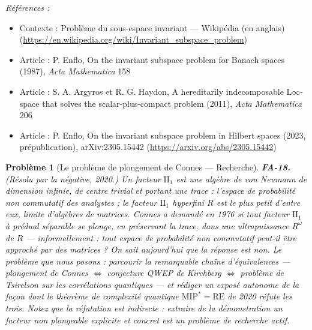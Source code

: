 \documentclass[11pt]{article}
\newtheorem{problem}{Problème}
\newenvironment{refs}{\par\small\noindent\emph{Références :}\begin{itemize}\setlength\itemsep{0pt}}{\end{itemize}\normalsize}
\begin{document}
\begin{refs}
\item Contexte : Problème du sous-espace invariant --- Wikipédia (en anglais) (\url{https://en.wikipedia.org/wiki/Invariant_subspace_problem})
\item Article : P. Enflo, \og{} On the invariant subspace problem for Banach spaces \fg{} (1987), \textit{Acta Mathematica} 158
\item Article : S. A. Argyros et R. G. Haydon, \og{} A hereditarily indecomposable L$\infty$-space that solves the scalar-plus-compact problem \fg{} (2011), \textit{Acta Mathematica} 206
\item Article : P. Enflo, \og{} On the invariant subspace problem in Hilbert spaces \fg{} (2023, prépublication), arXiv:2305.15442 (\url{https://arxiv.org/abs/2305.15442})
\end{refs}

\bigskip

\begin{problem}[{Le problème de plongement de Connes --- Recherche}]
\textbf{FA-18.} (Résolu par la négative, 2020.) Un facteur
$ \mathrm{II}_1 $ est une algèbre de von Neumann de dimension infinie, de centre trivial et portant une
trace : l'espace de probabilité non commutatif des analystes ; le facteur $ \mathrm{II}_1 $ hyperfini
$ R $ est le plus petit d'entre eux, limite d'algèbres de matrices. Connes a demandé en 1976 si tout
facteur $ \mathrm{II}_1 $ à prédual séparable se plonge, en préservant la trace, dans une ultrapuissance
$ R^{\omega} $ de $ R $ --- informellement : tout espace de probabilité non commutatif peut-il être
approché par des matrices ? On sait aujourd'hui que la réponse est \textit{non}. Le problème que nous posons :
parcourir la remarquable chaîne d'équivalences --- plongement de Connes $\Leftrightarrow$ conjecture QWEP de Kirchberg $\Leftrightarrow$
problème de Tsirelson sur les corrélations quantiques --- et rédiger un exposé autonome de la façon dont le
théorème de complexité quantique $ \mathrm{MIP}^{*} = \mathrm{RE} $ de 2020 réfute les trois. Notez que
la réfutation est indirecte : extraire de la démonstration un facteur non plongeable explicite et concret
est un problème de recherche actif.
\end{problem}
\end{document}
